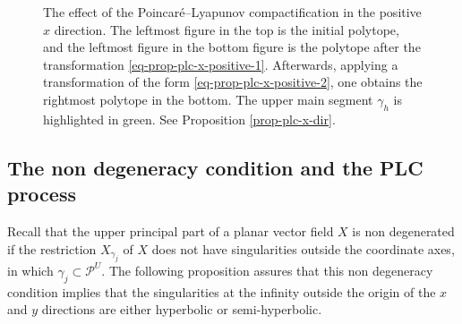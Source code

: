 \documentclass[12pt]{amsart}
\begin{document}
\begin{figure}[h]
\caption{\footnotesize{The effect of the Poincaré--Lyapunov compactification in the positive $x$ direction. The leftmost figure in the top is the initial polytope, and the leftmost figure in the bottom figure is the polytope after the transformation \eqref{eq-prop-plc-x-positive-1}. Afterwards, applying a transformation of the form \eqref{eq-prop-plc-x-positive-2}, one obtains the rightmost polytope in the bottom. The upper main segment $\gamma_{h}$ is highlighted in green. See Proposition \ref{prop-plc-x-dir}.}}
\label{fig-plc-x-dir}
\end{figure}


\subsection{The non degeneracy condition and the PLC process}\label{subsec-influence-non-degeneracy}

Recall that the upper principal part of a planar vector field $X$ is non degenerated if the restriction $X_{\gamma_{j}}$ of $X$ does not have singularities outside the coordinate axes, in which $\gamma_{j}\subset\mathcal{P}^{U}$. The following proposition assures that this non degeneracy condition implies that the singularities at the infinity outside the origin of the $x$ and $y$ directions are either hyperbolic or semi-hyperbolic.
\end{document}
